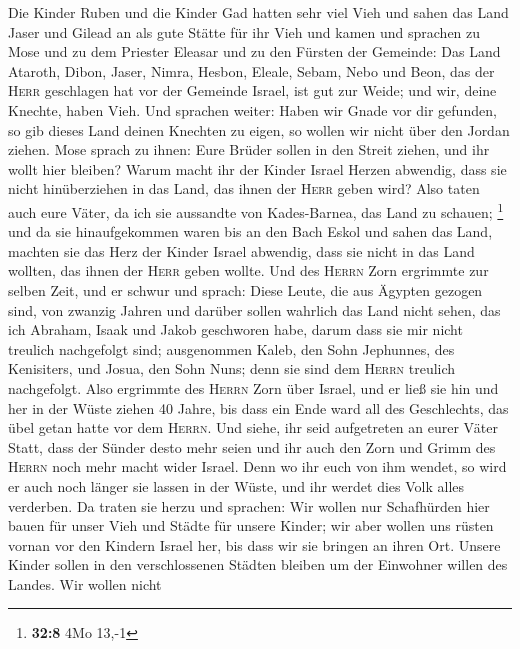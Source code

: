  Die Kinder Ruben und die Kinder Gad hatten sehr viel Vieh
und sahen das Land Jaser und Gilead an als gute Stätte für ihr Vieh
 und kamen und sprachen zu Mose und zu dem Priester
Eleasar und zu den Fürsten der Gemeinde:  Das Land
Ataroth, Dibon, Jaser, Nimra, Hesbon, Eleale, Sebam, Nebo und Beon,
 das der \textsc{Herr} geschlagen hat vor der Gemeinde
Israel, ist gut zur Weide; und wir, deine Knechte, haben Vieh.
 Und sprachen weiter: Haben wir Gnade vor dir gefunden, so
gib dieses Land deinen Knechten zu eigen, so wollen wir nicht über den
Jordan ziehen.  Mose sprach zu ihnen: Eure Brüder sollen
in den Streit ziehen, und ihr wollt hier bleiben?  Warum
macht ihr der Kinder Israel Herzen abwendig, dass sie nicht
hinüberziehen in das Land, das ihnen der \textsc{Herr} geben wird?
 Also taten auch eure Väter, da ich sie aussandte von
Kades-Barnea, das Land zu schauen; \footnote{\textbf{32:8} 4Mo 13,-1}
 und da sie hinaufgekommen waren bis an den Bach Eskol und
sahen das Land, machten sie das Herz der Kinder Israel abwendig, dass
sie nicht in das Land wollten, das ihnen der \textsc{Herr} geben wollte.
 Und des \textsc{Herrn} Zorn ergrimmte zur selben Zeit,
und er schwur und sprach:  Diese Leute, die aus Ägypten
gezogen sind, von zwanzig Jahren und darüber sollen wahrlich das Land
nicht sehen, das ich Abraham, Isaak und Jakob geschworen habe, darum
dass sie mir nicht treulich nachgefolgt sind; 
ausgenommen Kaleb, den Sohn Jephunnes, des Kenisiters, und Josua, den
Sohn Nuns; denn sie sind dem \textsc{Herrn} treulich nachgefolgt.
 Also ergrimmte des \textsc{Herrn} Zorn über Israel, und
er ließ sie hin und her in der Wüste ziehen 40 Jahre, bis dass ein Ende
ward all des Geschlechts, das übel getan hatte vor dem \textsc{Herrn}.
 Und siehe, ihr seid aufgetreten an eurer Väter Statt,
dass der Sünder desto mehr seien und ihr auch den Zorn und Grimm des
\textsc{Herrn} noch mehr macht wider Israel.  Denn wo ihr
euch von ihm wendet, so wird er auch noch länger sie lassen in der
Wüste, und ihr werdet dies Volk alles verderben.  Da
traten sie herzu und sprachen: Wir wollen nur Schafhürden hier bauen für
unser Vieh und Städte für unsere Kinder;  wir aber wollen
uns rüsten vornan vor den Kindern Israel her, bis dass wir sie bringen
an ihren Ort. Unsere Kinder sollen in den verschlossenen Städten bleiben
um der Einwohner willen des Landes.  Wir wollen nicht
